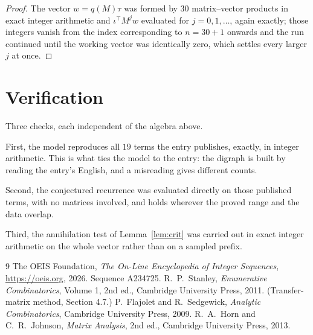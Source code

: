 \documentclass[11pt,a4paper]{article}
\theoremstyle{plain}
\theoremstyle{definition}
\begin{document}
\begin{proof}
The vector $w=q(M)\tau$ was formed by $30$ matrix--vector products in exact integer
arithmetic and $\iota^{\!\top}M^{j}w$ evaluated for $j=0,1,\dots$, again exactly; those
integers vanish from the index corresponding to $n=30+1$ onwards and the run continued
until the working vector was identically zero, which settles every larger $j$ at once.
\end{proof}

\section{Verification}

Three checks, each independent of the algebra above.

First, the model reproduces all $19$ terms the entry publishes, exactly, in integer
arithmetic. This is what ties the model to the entry: the digraph is built by reading the
entry's English, and a misreading gives different counts.

Second, the conjectured recurrence was evaluated directly on those published terms, with no
matrices involved, and holds wherever the proved range and the data overlap.

Third, the annihilation test of Lemma~\ref{lem:crit} was carried out in exact integer
arithmetic on the whole vector rather than on a sampled prefix.

\begin{thebibliography}{9}
 The OEIS Foundation, \emph{The On-Line Encyclopedia of Integer
Sequences}, \url{https://oeis.org}, 2026. Sequence A234725.
 R.~P.~Stanley, \emph{Enumerative Combinatorics}, Volume 1, 2nd ed.,
Cambridge University Press, 2011. (Transfer-matrix method, Section 4.7.)
 P.~Flajolet and R.~Sedgewick, \emph{Analytic Combinatorics}, Cambridge
University Press, 2009.
 R.~A.~Horn and C.~R.~Johnson, \emph{Matrix Analysis}, 2nd ed., Cambridge
University Press, 2013.
\end{thebibliography}
\end{document}
